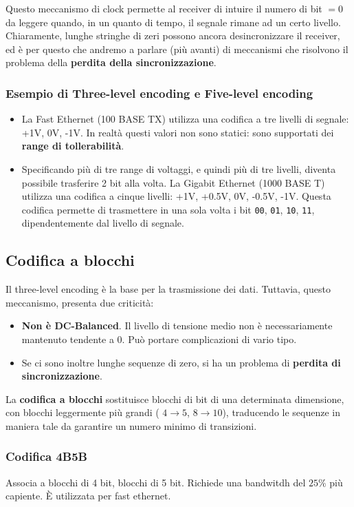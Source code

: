 Questo meccanismo di clock permette al receiver di intuire il numero di bit $=0$ da leggere quando, in un quanto di tempo, il segnale rimane ad un certo livello. Chiaramente, lunghe stringhe di zeri possono ancora desincronizzare il receiver, ed è per questo che andremo a parlare (più avanti) di meccanismi che risolvono il problema della \textbf{perdita della sincronizzazione}.


\subsubsection{Esempio di Three-level encoding e Five-level encoding}
\begin{itemize}
	\item La Fast Ethernet (100 BASE TX) utilizza una codifica a tre livelli di segnale: +1V, 0V, -1V. In realtà questi valori non sono statici: sono supportati dei \textbf{range di tollerabilità}.
	\item Specificando più di tre range di voltaggi, e quindi più di tre livelli, diventa possibile trasferire 2 bit alla volta.
	La Gigabit Ethernet (1000 BASE T) utilizza una codifica a cinque livelli: +1V, +0.5V, 0V, -0.5V, -1V. Questa codifica permette di trasmettere in una sola volta i bit \verb|00|, \verb|01|, \verb|10|, \verb|11|, dipendentemente dal livello di segnale.
\end{itemize}

\newpage

\subsection{Codifica a blocchi}
Il three-level encoding è la base per la trasmissione dei dati. Tuttavia, questo meccanismo, presenta due criticità:
\begin{itemize}
	\item \textbf{Non è DC-Balanced}. Il livello di tensione medio non è necessariamente mantenuto tendente a 0. Può portare complicazioni di vario tipo.
	\item Se ci sono inoltre lunghe sequenze di zero, si ha un problema di \textbf{perdita di sincronizzazione}.
\end{itemize}
La \textbf{codifica a blocchi} sostituisce blocchi di bit di una determinata dimensione, con blocchi leggermente più grandi ( $4\to5$, $8\to 10$), traducendo le sequenze in maniera tale da garantire un numero minimo di transizioni.

\subsubsection{Codifica 4B5B}
Associa a blocchi di 4 bit, blocchi di 5 bit. Richiede una bandwitdh del $25\%$ più capiente. È utilizzata per fast ethernet.

